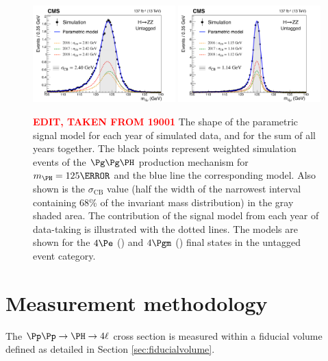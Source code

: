 \begin{figure}[!htb]
	\centering
	\includegraphics[width=0.49\textwidth]{Images/H4L/Signal/HZZ4e_lineshape.pdf}
	\includegraphics[width=0.49\textwidth]{Images/H4L/Signal/HZZ4mu_lineshape.pdf}
	\caption{
		\textcolor{red}{\textbf{EDIT, TAKEN FROM 19001}}
		The shape of the parametric signal model for each year of simulated data, and for the sum of all years together.
		The black points represent weighted simulation events of the $\ggH$ production mechanism for $\mH=125\GeV$ and the blue line the corresponding model.
		Also shown is the $\sigma_{\text{CB}}$ value (half the width of the narrowest interval containing 68\% of the invariant mass distribution) in the gray shaded area.
		The contribution of the signal model from each year of data-taking is illustrated with the dotted lines.
		The models are shown for the $4\Pe$ (\cmsLeft) and $4\Pgm$ (\cmsRight) final states in the untagged event category.
		\label{fig:signal_fit}}
\end{figure}

\section{Measurement methodology}
\label{sec:measurement}

The $\Pp\Pp\to\Hllll$ cross section is measured within a fiducial volume defined as detailed in Section \ref{sec:fiducialvolume}.

